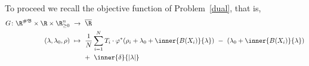 To proceed we recall the objective function of Problem~\ref{dual}, that is,
\begin{align*}
  G\colon
  \R^{\#\mathfrak{B}}
  \times
  \R
  \times
  \R^n_{\ge 0}
  &
  \ 
  \to
  \ 
  \overline{\R}
  \\
  \left( 
    \lambda,
    \lambda_0,
    \rho
  \right)
  &
  \ 
  \mapsto
  \ 
    \frac{1}{N}
\sum_{i=1} 
  ^N
    T_i
    \cdot
  \varphi^*
  \!
  \left( 
    \rho_i
    +
\lambda_0
+
\inner
{B(X_i)}
{
\lambda
}
  \right)
  \ 
  -
  \ 
  \left( 
\lambda_0
+
\inner
{B(X_i)}
{
\lambda
}
  \right)
  \\
  &
  \qquad 
+
\ 
\inner
{\delta}
{
  |\lambda|
}
\end{align*}
